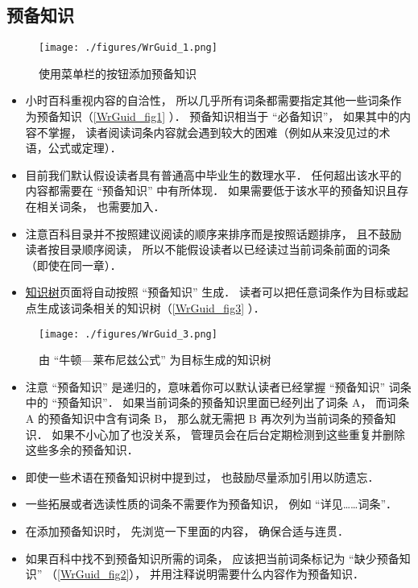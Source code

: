 \subsection{预备知识}
\begin{figure}[ht]
\centering
\texttt{[image: ./figures/WrGuid\_1.png]}
\caption{使用菜单栏的按钮添加预备知识} \label{WrGuid_fig1}
\end{figure}

\begin{itemize}
\item 小时百科重视内容的自洽性， 所以几乎所有词条都需要指定其他一些词条作为预备知识（\autoref{WrGuid_fig1} ）． 预备知识相当于 “必备知识”， 如果其中的内容不掌握， 读者阅读词条内容就会遇到较大的困难（例如从来没见过的术语，公式或定理）．
\item 目前我们默认假设读者具有普通高中毕业生的数理水平． 任何超出该水平的内容都需要在 “预备知识” 中有所体现． 如果需要低于该水平的预备知识且存在相关词条， 也需要加入．
\item 注意百科目录并不按照建议阅读的顺序来排序而是按照话题排序， 且不鼓励读者按目录顺序阅读， 所以不能假设读者以已经读过当前词条前面的词条（即使在同一章）．
\item \href{https://wuli.wiki/tree/}{知识树}页面将自动按照 “预备知识” 生成． 读者可以把任意词条作为目标或起点生成该词条相关的知识树（\autoref{WrGuid_fig3} ）．
\end{itemize}

\begin{figure}[ht]
\centering
\texttt{[image: ./figures/WrGuid\_3.png]}
\caption{由 “牛顿—莱布尼兹公式” 为目标生成的知识树} \label{WrGuid_fig3}
\end{figure}

\begin{itemize}
\item 注意 “预备知识” 是递归的，意味着你可以默认读者已经掌握 “预备知识” 词条中的 “预备知识”． 如果当前词条的预备知识里面已经列出了词条 A， 而词条 A 的预备知识中含有词条 B， 那么就无需把 B 再次列为当前词条的预备知识． 如果不小心加了也没关系， 管理员会在后台定期检测到这些重复并删除这些多余的预备知识．
\item 即使一些术语在预备知识树中提到过， 也鼓励尽量添加引用以防遗忘．
\item 一些拓展或者选读性质的词条不需要作为预备知识， 例如 “详见……词条”．
\item 在添加预备知识时， 先浏览一下里面的内容， 确保合适与连贯．
\item 如果百科中找不到预备知识所需的词条， 应该把当前词条标记为 “缺少预备知识” （\autoref{WrGuid_fig2}）， 并用注释说明需要什么内容作为预备知识．
\end{itemize}

